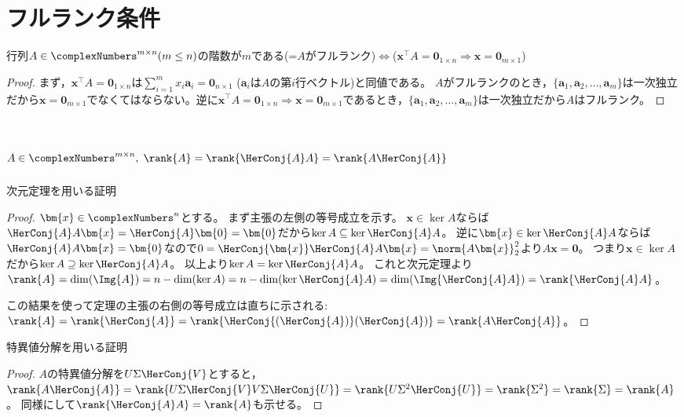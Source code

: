     \section{フルランク条件}
        \begin{shadebox}
            行列$A\in\complexNumbers^{m\times n}(m\leq n)$の階数が$m$である(=$A$がフルランク)$\Leftrightarrow$($\bm{x}^\top A=\bm{0}_{1\times n}\Rightarrow\bm{x}=\bm{0}_{m\times1}$)
        \end{shadebox}
        \begin{proof}
            \quad\par
            まず，$\bm{x}^\top A=\bm{0}_{1\times n}$は$\sum_{i=1}^{m}x_i\bm{a}_i=\bm{0}_{n\times1}$ ($\bm{a}_i$は$A$の第$i$行ベクトル)と同値である。
            $A$がフルランクのとき，$\{\bm{a}_1,\bm{a}_2,\dotsc,\bm{a}_m\}$は一次独立だから$\bm{x}=\bm{0}_{m\times1}$でなくてはならない。逆に$\bm{x}^\top A=\bm{0}_{1\times n}\Rightarrow\bm{x}=\bm{0}_{m\times1}$であるとき，$\{\bm{a}_1,\bm{a}_2,\dotsc,\bm{a}_m\}$は一次独立だから$A$はフルランク。
        \end{proof}
    \section{\texorpdfstring{$A \in \complexNumbers^{m\times n},\;\rank{A} = \rank{\HerConj{A} A} = \rank{A\HerConj{A}}$}{A∈C\string^(m×n), rank(A) = rank(A\string^*A) = rank(AA\string^*)}}
        次元定理を用いる証明
        \begin{proof}
            \quad\par
            $\bm{x} \in \complexNumbers^n$とする。
            まず主張の左側の等号成立を示す。
            $\bm{x} \in \ker{A}$ならば$\HerConj{A} A\bm{x} = \HerConj{A}\bm{0} = \bm{0}$だから$\ker{A} \subseteq \ker{\HerConj{A} A}$。
            逆に$\bm{x} \in \ker{\HerConj{A}A}$ならば$\HerConj{A}A\bm{x} = \bm{0}$なので$0 = \HerConj{\bm{x}}\HerConj{A}A\bm{x} = \norm{A\bm{x}}_2^2$より$A\bm{x} = \bm{0}$。
            つまり$\bm{x} \in \ker{A}$だから$\ker{A} \supseteq \ker{\HerConj{A} A}$。
            以上より$\ker{A} = \ker{\HerConj{A} A}$。
            これと次元定理より$\rank{A} = \dim(\Img{A}) = n - \dim(\ker{A}) = n - \dim(\ker{\HerConj{A}A}) = \dim(\Img{\HerConj{A}A}) = \rank{\HerConj{A}A}$。
            \par
            この結果を使って定理の主張の右側の等号成立は直ちに示される:\;
            $\rank{A} = \rank{\HerConj{A}} = \rank{\HerConj{(\HerConj{A})}(\HerConj{A})} = \rank{A\HerConj{A}}$。
        \end{proof}
        特異値分解を用いる証明
        \begin{proof}
            \quad\par
            $A$の特異値分解を$U\Sigma \HerConj{V}$とすると，$\rank{A\HerConj{A}} = \rank{U\Sigma \HerConj{V}V\Sigma \HerConj{U}} = \rank{U\Sigma^2 \HerConj{U}} = \rank{\Sigma^2} = \rank{\Sigma} = \rank{A}$。
            同様にして$\rank{\HerConj{A}A} = \rank{A}$も示せる。
        \end{proof}

